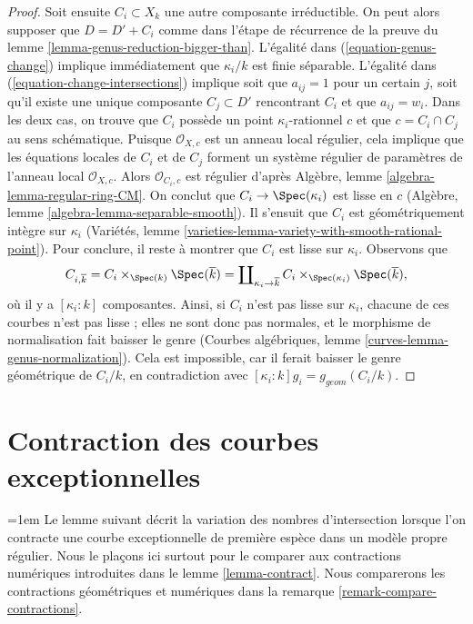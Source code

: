 \begin{proof}
\medskip\noindent
Soit ensuite $C_i \subset X_k$ une autre composante irréductible.
On peut alors supposer que $D = D' + C_i$ comme dans l'étape de récurrence
de la preuve du lemme \ref{lemma-genus-reduction-bigger-than}.
L'égalité dans (\ref{equation-genus-change}) implique immédiatement que
$\kappa_i/k$ est finie séparable. L'égalité dans
(\ref{equation-change-intersections}) implique soit que $a_{ij} = 1$ pour
un certain $j$, soit qu'il existe une unique composante
$C_j \subset D'$ rencontrant $C_i$ et que $a_{ij} = w_i$.
Dans les deux cas, on trouve que $C_i$ possède un point
$\kappa_i$-rationnel $c$ et que $c = C_i \cap C_j$ au sens schématique.
Puisque $\mathcal{O}_{X,c}$ est un anneau local régulier, cela implique que
les équations locales de $C_i$ et de $C_j$ forment un système régulier de
paramètres de l'anneau local $\mathcal{O}_{X,c}$. Alors
$\mathcal{O}_{C_i,c}$ est régulier d'après Algèbre, lemme
\ref{algebra-lemma-regular-ring-CM}. On conclut que
$C_i \to \Spec(\kappa_i)$ est lisse en $c$ (Algèbre, lemme
\ref{algebra-lemma-separable-smooth}). Il s'ensuit que $C_i$ est
géométriquement intègre sur $\kappa_i$ (Variétés, lemme
\ref{varieties-lemma-variety-with-smooth-rational-point}). Pour conclure,
il reste à montrer que $C_i$ est lisse sur $\kappa_i$. Observons que
$$
C_{i, \overline{k}} = C_i \times_{\Spec(k)} \Spec(\overline{k})
= \coprod\nolimits_{\kappa_i \to \overline{k}}
C_i \times_{\Spec(\kappa_i)} \Spec(\overline{k}),
$$
où il y a $[\kappa_i : k]$ composantes. Ainsi, si $C_i$ n'est pas lisse
sur $\kappa_i$, chacune de ces courbes n'est pas lisse ; elles ne sont donc
pas normales, et le morphisme de normalisation fait baisser le genre
(Courbes algébriques, lemme \ref{curves-lemma-genus-normalization}). Cela
est impossible, car il ferait baisser le genre géométrique de $C_i/k$, en
contradiction avec $[\kappa_i : k]g_i = g_{geom}(C_i/k)$.
\end{proof}








\section{Contraction des courbes exceptionnelles}
\label{section-contract}

\begingroup
\emergencystretch=1em
\noindent
Le lemme suivant décrit la variation des nombres d'intersection lorsque
l'on contracte une courbe exceptionnelle de première espèce dans un modèle
propre régulier. Nous le plaçons ici surtout pour le comparer aux
contractions numériques introduites dans le lemme \ref{lemma-contract}.
Nous comparerons les contractions géométriques et numériques dans la
remarque \ref{remark-compare-contractions}.
\par
\endgroup

